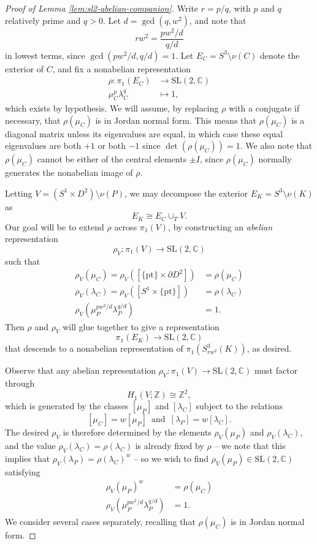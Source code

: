 \documentclass[10pt,a4paper]{amsart}
\newcommand{\C}{\mathbb{C}}
\newcommand\SL{\mathrm{SL}}
\newcommand{\Z}{\mathbb{Z}}
\newcommand{\pt}{\mathrm{pt}}
\begin{document}
\begin{proof}[Proof of Lemma \ref{lem:sl2-abelian-companion}]
Write $r = p/q$, with $p$ and $q$ relatively prime and $q > 0$.  Let $d=\gcd(q,w^2)$, and note that
\[ rw^2 = \frac{pw^2/d}{q/d} \]
in lowest terms, since $\gcd(pw^2/d, q/d) = 1$.  Let $E_C = S^3 \setminus \nu(C)$ denote the exterior of $C$, and fix a nonabelian representation
\begin{align*}
\rho: \pi_1(E_C) &\to \SL(2,\C) \\
\mu_C^p \lambda_C^q &\mapsto 1,
\end{align*}
which exists by hypothesis.  We will assume, by replacing $\rho$ with a conjugate if necessary, that $\rho(\mu_C)$ is in Jordan normal form.  This means that $\rho(\mu_C)$ is a diagonal matrix unless its eigenvalues are equal, in which case these equal eigenvalues are  both $+1$ or both $-1$  since $\det(\rho(\mu_C)) = 1$.  We also note that $\rho(\mu_C)$ cannot be either of the central elements $\pm I$, since $\rho(\mu_C)$  normally generates the nonabelian image of $\rho$.

Letting $V = (S^1\times D^2) \setminus \nu(P)$, we may decompose the exterior $E_K = S^3\setminus \nu(K)$ as
\[ E_K \cong E_C \cup_T V. \]
Our goal will be to extend $\rho$ across $\pi_1(V)$, by constructing an \emph{abelian} representation
\[ \rho_V: \pi_1(V) \to \SL(2,\C) \]
such that
\begin{align*}
\rho_V(\mu_C) = \rho_V( [\{\pt\} \times \partial D^2] ) &= \rho(\mu_C) \\
\rho_V(\lambda_C) = \rho_V( [S^1 \times \{\pt\}] ) &= \rho(\lambda_C) \\
\rho_V(\mu_P^{pw^2/d} \lambda_P^{q/d}) &= 1.
\end{align*}
Then $\rho$ and $\rho_V$ will glue together to give a representation \[\pi_1(E_K) \to \SL(2,\C)\] that descends to a nonabelian representation of $\pi_1(S^3_{rw^2}(K))$, as desired.

Observe that any abelian representation $\rho_V: \pi_1(V) \to \SL(2,\C)$ must factor through 
\[ H_1(V;\Z) \cong \Z^2, \]
which is generated by the classes $[\mu_P]$ and $[\lambda_C]$ subject to the relations
\[
[\mu_C] = w [\mu_P]\, \textrm{ and }\,
[\lambda_P] = w[\lambda_C].
\]
The desired $\rho_V$ is therefore determined by the elements $\rho_V(\mu_P)$ and $\rho_V(\lambda_C)$, and the value $\rho_V(\lambda_C) = \rho(\lambda_C)$ is already fixed by $\rho$ -- we note that this implies that $\rho_V(\lambda_P) = \rho(\lambda_C)^w$ -- so we wish to find $\rho_V(\mu_P) \in \SL(2,\C)$ satisfying
\begin{align*}
\rho_V(\mu_P)^w &= \rho(\mu_C) \\
\rho_V(\mu_P^{pw^2/d} \lambda_P^{q/d}) &= 1.
\end{align*}
We consider several cases separately, recalling that $\rho(\mu_C)$ is in Jordan normal form.


\end{proof}
\end{document}
